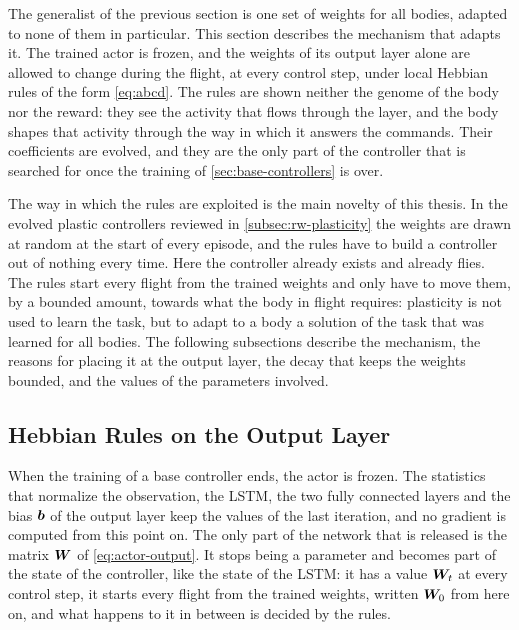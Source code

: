 The generalist of the previous section is one set of weights for all bodies, adapted to none of them in particular. This section describes the mechanism that adapts it. The trained actor is frozen, and the weights of its output layer alone are allowed to change during the flight, at every control step, under local Hebbian rules of the form \eqref{eq:abcd}. The rules are shown neither the genome of the body nor the reward: they see the activity that flows through the layer, and the body shapes that activity through the way in which it answers the commands. Their coefficients are evolved, and they are the only part of the controller that is searched for once the training of \autoref{sec:base-controllers} is over.

The way in which the rules are exploited is the main novelty of this thesis. In the evolved plastic controllers reviewed in \autoref{subsec:rw-plasticity} the weights are drawn at random at the start of every episode, and the rules have to build a controller out of nothing every time. Here the controller already exists and already flies. The rules start every flight from the trained weights and only have to move them, by a bounded amount, towards what the body in flight requires: plasticity is not used to learn the task, but to adapt to a body a solution of the task that was learned for all bodies. The following subsections describe the mechanism, the reasons for placing it at the output layer, the decay that keeps the weights bounded, and the values of the parameters involved.

\subsection{Hebbian Rules on the Output Layer}
\label{subsec:hebbian-rules}

When the training of a base controller ends, the actor is frozen. The statistics that normalize the observation, the LSTM, the two fully connected layers and the bias $\bm{b}$ of the output layer keep the values of the last iteration, and no gradient is computed from this point on. The only part of the network that is released is the matrix $\bm{W}$ of \eqref{eq:actor-output}. It stops being a parameter and becomes part of the state of the controller, like the state of the LSTM: it has a value $\bm{W}_t$ at every control step, it starts every flight from the trained weights, written $\bm{W}_0$ from here on, and what happens to it in between is decided by the rules.

